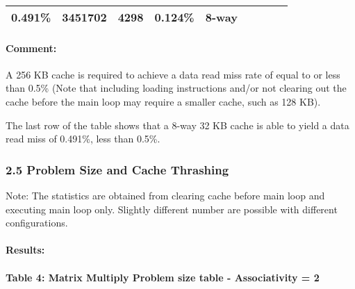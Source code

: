 \documentclass[11pt]{article}
\begin{document}
\begin{longtable}[]{@{}lllllllll@{}}
\begin{minipage}[t]{0.08\columnwidth}
0.491\%\strut
\end{minipage} & \begin{minipage}[t]{0.08\columnwidth}\raggedright\strut
3451702\strut
\end{minipage} & \begin{minipage}[t]{0.09\columnwidth}\raggedright\strut
4298\strut
\end{minipage} & \begin{minipage}[t]{0.09\columnwidth}\raggedright\strut
0.124\%\strut
\end{minipage} & \begin{minipage}[t]{0.06\columnwidth}\raggedright\strut
8-way\strut
\end{minipage}\tabularnewline
\bottomrule
\end{longtable}

\paragraph{Comment:}\label{comment}

A 256 KB cache is required to achieve a data read miss rate of equal to
or less than 0.5\% (Note that including loading instructions and/or not
clearing out the cache before the main loop may require a smaller cache,
such as 128 KB).

The last row of the table shows that a 8-way 32 KB cache is able to
yield a data read miss of 0.491\%, less than 0.5\%.

    \subsubsection{2.5 Problem Size and Cache
Thrashing}\label{problem-size-and-cache-thrashing}

Note: The statistics are obtained from clearing cache before main loop
and executing main loop only. Slightly different number are possible
with different configurations.

\paragraph{Results:}\label{results}

\paragraph{Table 4: Matrix Multiply Problem size table - Associativity =
2}\label{table-4-matrix-multiply-problem-size-table---associativity-2}
\end{document}
